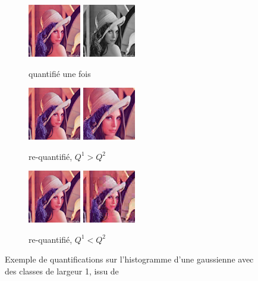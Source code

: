 \documentclass[utf8]{stageM2R} %
\begin{document}
\begin{center}
  \begin{figure}
    \begin{subfigure}{.33\textwidth}
      \centering
      \includegraphics[width=23mm]{images/lena_base.jpg} \includegraphics[width=23mm]{images/lena_bw.jpg}
      \caption{quantifié une fois}
      \label{lena-bw}
    \end{subfigure}
    \begin{subfigure}{.33\textwidth}
      \centering
      \includegraphics[width=23mm]{images/lena_base.jpg} \includegraphics[width=23mm]{images/lena_crop.jpg}
      \caption{re-quantifié, $Q^{1} > Q^{2}$}
      \label{lena-crop}
    \end{subfigure}
    \begin{subfigure}{.33\textwidth}
      \centering
      \includegraphics[width=23mm]{images/lena_base.jpg} \includegraphics[width=23mm]{images/lena_comp.jpg}
      \caption{re-quantifié, $Q^{1} < Q^{2}$}
      \label{lena-comp}
    \end{subfigure}
    \caption{Exemple de quantifications sur l'histogramme d'une gaussienne avec des classes de largeur 1, issu de \cite{feng2010jpeg}}
    \label{fig:near-duplicates-images}
  \end{figure}
\end{center}
\end{document}
